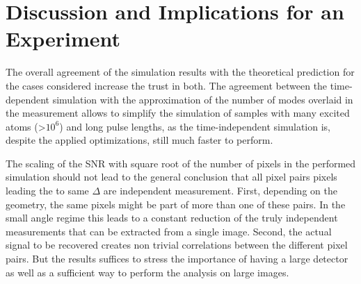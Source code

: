 \section{Discussion and Implications for an Experiment}
The overall agreement of the simulation results with the theoretical prediction for the cases considered increase the trust in both. The agreement between the time-dependent simulation with the approximation of the number of modes overlaid in the measurement allows to simplify the simulation of samples with many excited atoms (>$10^6$) and long pulse lengths, as the time-independent simulation is, despite the applied optimizations, still much faster to perform. 

The scaling of the SNR with square root of the number of pixels in the performed simulation should not lead to the general conclusion that all pixel pairs pixels leading the to same $\Delta $ are independent measurement. First, depending on the geometry, the same pixels might be part of more than one of these pairs. In the small angle regime this leads to a constant reduction of the truly independent measurements that can be extracted from a single image. Second, the actual signal to be recovered creates non trivial correlations between the different pixel pairs. But the results suffices to stress the importance of having a large detector as well as a sufficient way to perform the analysis on large images.


